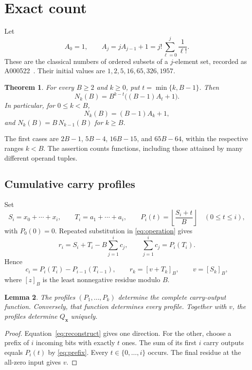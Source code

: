 \documentclass[11pt,a4paper]{article}
\newtheorem{theorem}{Theorem}
\newtheorem{lemma}[theorem]{Lemma}
\theoremstyle{definition}\newtheorem{definition}[theorem]{Definition}
\newcommand{\xvec}{\boldsymbol x}
\begin{document}
\section{Exact count}
Let
\begin{equation}\label{eq:arrangements}
 A_0=1,\qquad A_j=jA_{j-1}+1
       =j!\sum_{\ell=0}^{j}\frac1{\ell!}.
\end{equation}
These are the classical numbers of ordered subsets of a $j$-element set,
recorded as A000522~\cite{oeis}. Their initial values are
$1,2,5,16,65,326,1957$.

\begin{theorem}\label{thm:main}
For every $B\geq2$ and $k\geq0$, put $t=\min\{k,B-1\}$. Then
\begin{equation}\label{eq:count}
 \boxed{N_k(B)=B^{k-t}\bigl((B-1)A_t+1\bigr).}
\end{equation}
In particular, for $0\leq k<B$,
\begin{equation}\label{eq:short}
 N_k(B)=(B-1)A_k+1,
\end{equation}
and $N_k(B)=B\,N_{k-1}(B)$ for $k\geq B$.
\end{theorem}

The first cases are $2B-1$, $5B-4$, $16B-15$, and $65B-64$,
within the respective ranges $k<B$. The assertion counts functions,
including those attained by many different operand tuples.

\subsection{Cumulative carry profiles}
Set
\[
 S_i=x_0+\cdots+x_i,\qquad T_i=a_1+\cdots+a_i,
 \qquad P_i(t)=\left\lfloor\frac{S_i+t}{B}\right\rfloor
 \quad(0\leq t\leq i),
\]
with $P_0(0)=0$.
Repeated substitution in \eqref{eq:operation} gives
\begin{equation}\label{eq:prefix}
 r_i=S_i+T_i-B\sum_{j=1}^{i}c_j,
 \qquad \sum_{j=1}^{i}c_j=P_i(T_i).
\end{equation}
Hence
\begin{equation}\label{eq:reconstruct}
 c_i=P_i(T_i)-P_{i-1}(T_{i-1}),\qquad
 r_k=[v+T_k]_B,\qquad v=[S_k]_B,
\end{equation}
where $[z]_B$ is the least nonnegative residue modulo $B$.

\begin{lemma}\label{lem:profiles}
The profiles $(P_1,\ldots,P_k)$ determine the complete carry-output
function. Conversely, that function determines every profile.
Together with $v$, the profiles determine $Q_{\xvec}$ uniquely.
\end{lemma}
\begin{proof}
Equation~\eqref{eq:reconstruct} gives one direction.
For the other, choose a prefix of $i$ incoming bits with exactly $t$ ones.
The sum of its first $i$ carry outputs equals $P_i(t)$ by
\eqref{eq:prefix}. Every $t\in\{0,\ldots,i\}$ occurs.
The final residue at the all-zero input gives $v$.
\end{proof}
\end{document}
